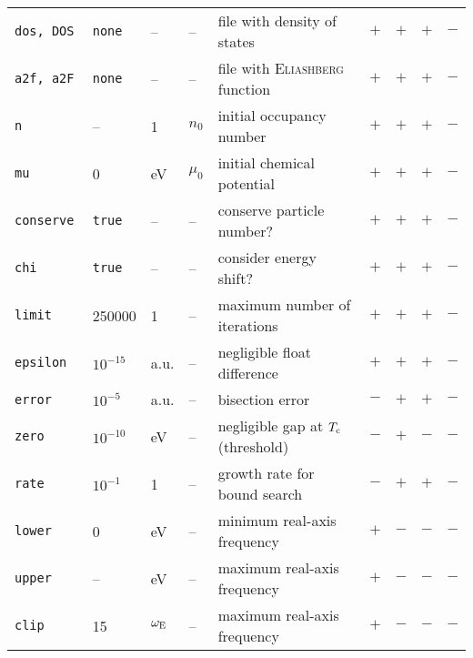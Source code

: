 \documentclass[a4paper]{article}
\def\sub#1{\sb{\mathrm{#1}}}
\newlength\gap
\begin{document}
\begin{table}[b]
\begin{tabular}{*9l}
         \tt dos, DOS      & \tt none    & --               & --                  & file with density of states                & $+$ & $+$ & $+$ & $-$ \\
         \tt a2f, a2F      & \tt none    & --               & --                  & file with \textsc{Eliashberg} function     & $+$ & $+$ & $+$ & $-$ \\[\gap]
         \tt n             & --          & 1                & $n_0$               & initial occupancy number                   & $+$ & $+$ & $+$ & $-$ \\
         \tt mu            & 0           & eV               & $\mu_0$             & initial chemical potential                 & $+$ & $+$ & $+$ & $-$ \\
         \tt conserve      & \tt true    & --               & --                  & conserve particle number?                  & $+$ & $+$ & $+$ & $-$ \\
         \tt chi           & \tt true    & --               & --                  & consider energy shift?                     & $+$ & $+$ & $+$ & $-$ \\[\gap]
         \tt limit         & 250000      & 1                & --                  & maximum number of iterations               & $+$ & $+$ & $+$ & $-$ \\[\gap]
         \tt epsilon       & $10^{-15}$  & a.u.             & --                  & negligible float difference                & $+$ & $+$ & $+$ & $-$ \\
         \tt error         & $10^{-5}$   & a.u.             & --                  & bisection error                            & $-$ & $+$ & $+$ & $-$ \\
         \tt zero          & $10^{-10}$  & eV               & --                  & negligible gap at $T \sub c$ (threshold)   & $-$ & $+$ & $-$ & $-$ \\
         \tt rate          & $10^{-1}$   & 1                & --                  & growth rate for bound search               & $-$ & $+$ & $+$ & $-$ \\[\gap]
         \tt lower         & 0           & eV               & --                  & minimum real-axis frequency                & $+$ & $-$ & $-$ & $-$ \\
         \tt upper         & --          & eV               & --                  & maximum real-axis frequency                & $+$ & $-$ & $-$ & $-$ \\
         \tt clip          & 15          & $\omega \sub E$  & --                  & maximum real-axis frequency                & $+$ & $-$ & $-$ & $-$ \\

\end{tabular}
\end{table}
\end{document}
